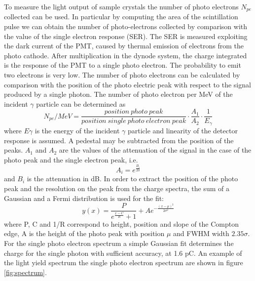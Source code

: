 To measure the light output of sample crystals the number of photo electrons $N_{pe}$ collected can be used.
In particular by computing the area of the scintillation pulse we can obtain the number of photo-electrons collected by comparison with the value of the single electron response (SER).
The SER is measured exploiting the dark current of the PMT, caused by thermal emission of electrons from the photo cathode.
After multiplication in the dynode system, the charge integrated is the response of the PMT to a single photo electron.
The probability to emit two electrons is very low.
The number of photo electrons can be calculated by comparison with the position of the photo electric peak with respect to the signal produced by a single photon. The number of photo electron per MeV of the incident $\gamma$ particle can be determined as
\begin{equation}
N_{pe}/MeV=\frac{position\ photo\ peak}{position\ single\ photo\ electron\ peak} \cdot \frac{A_{1}}{A_{2}} \cdot \frac{1}{E_{\gamma}}
\end{equation}
where $E\gamma$ is the energy of the incident $\gamma$ particle and linearity of the detector response is assumed. A pedestal may be subtracted from the position of the peaks. $A_{1}$ and $A_{2}$ are the values of the attenuation of the signal in the case of the photo peak and the single electron peak, i.e.
\begin{equation}
A_{i}=e^{\frac{B_{i}}{20}}
\end{equation}
and $B_{i}$ is the attenuation in dB.
In order to extract the position of the photo peak and the resolution on the peak  from the charge spectra, the sum of a Gaussian and a Fermi distribution is used for the fit:
\begin{equation}
y(x)=\frac{P}{e^{\frac{x-C}{R}}+1}+Ae^{-\frac{(x-\mu)^{2}}{2\sigma ^{2}}}
\end{equation}
where P, C and 1/R correspond to height, position and slope of the Compton edge, A is the height of the photo peak with position $\mu$ and FWHM width $2.35\sigma$.
For the single photo electron spectrum a simple Gaussian fit determines the charge for the single photon with sufficient accuracy, at 1.6 pC.
An example of the light yield spectrum the single photo electron spectrum are shown in figure \ref{fig:spectrum}.
